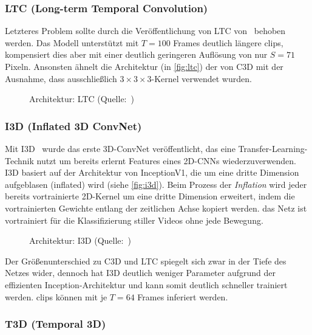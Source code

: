 \subsubsection*{LTC (Long-term Temporal Convolution)}

Letzteres Problem sollte durch die Veröffentlichung von LTC von~\cite{Varol18} behoben werden.
Das Modell unterstützt mit $T=100$ Frames deutlich längere \glspl{clip}, kompensiert dies aber mit einer deutlich geringeren Auflösung von nur $S=71$ Pixeln.
Ansonsten ähnelt die Architektur (in \autoref{fig:ltc}) der von C3D mit der Ausnahme, dass ausschließlich $3 \times 3 \times 3$-Kernel verwendet wurden.

\begin{figure}[h!]
    \centering
    \caption{Architektur: LTC (Quelle:~\cite{Varol18})}
    \label{fig:ltc}
\end{figure}

\subsubsection*{I3D (Inflated 3D ConvNet)}

Mit I3D~\cite{Carreira17} wurde das erste 3D-ConvNet veröffentlicht, das eine Transfer-Learning-Technik nutzt um bereits erlernt Features eines 2D-CNNs wiederzuverwenden.
I3D basiert auf der Architektur von InceptionV1, die um eine dritte Dimension aufgeblasen (inflated) wird (siehe \autoref{fig:i3d}).
Beim Prozess der \emph{Inflation} wird jeder bereits vortrainierte 2D-Kernel um eine dritte Dimension erweitert, indem die vortrainierten Gewichte entlang der zeitlichen Achse kopiert werden.
\Dh das Netz ist vortrainiert für die Klassifizierung stiller Videos ohne jede Bewegung.

\begin{figure}[h!]
    \centering
    \caption{Architektur: I3D (Quelle:~\cite{Carreira17})}
    \label{fig:i3d}
\end{figure}

Der Größenunterschied zu C3D und LTC spiegelt sich zwar in der Tiefe des Netzes wider, dennoch hat I3D deutlich weniger Parameter aufgrund der effizienten Inception-Architektur und kann somit deutlich schneller trainiert werden.
\glspl{clip} können mit je $T=64$ Frames inferiert werden.

\subsubsection*{T3D (Temporal 3D)}

